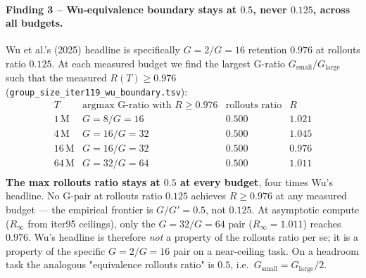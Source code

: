 \paragraph{Finding 3 -- Wu-equivalence boundary stays at $0.5$, never
$0.125$, across all budgets.}
Wu et al.'s (2025) headline is specifically $G{=}2/G{=}16$ retention
$0.976$ at rollouts ratio $0.125$.  At each measured budget we find
the largest G-ratio $G_{\mathrm{small}}/G_{\mathrm{large}}$ such that
the measured $R(T){\ge}0.976$
(\texttt{group\_size\_iter119\_wu\_boundary.tsv}):
\[
\begin{array}{lccc}
T & \text{argmax G-ratio with }R{\ge}0.976 & \text{rollouts ratio} & R \\
\hline
1\,\mathrm{M}  & G{=}8/G{=}16   & 0.500 & 1.021 \\
4\,\mathrm{M}  & G{=}16/G{=}32  & 0.500 & 1.045 \\
16\,\mathrm{M} & G{=}16/G{=}32  & 0.500 & 0.976 \\
64\,\mathrm{M} & G{=}32/G{=}64  & 0.500 & 1.011 \\
\end{array}
\]
\textbf{The max rollouts ratio stays at $0.5$ at every budget}, four
times Wu's headline.  No G-pair at rollouts ratio $0.125$ achieves
$R{\ge}0.976$ at any measured budget --- the empirical frontier is
$G/G'{=}0.5$, not $0.125$.  At asymptotic compute ($R_\infty$ from
iter95 ceilings), only the $G{=}32/G{=}64$ pair
($R_\infty{=}1.011$) reaches $0.976$.  Wu's headline is therefore
\emph{not} a property of the rollouts ratio per se; it is a property
of the specific $G{=}2/G{=}16$ pair on a near-ceiling task.  On a
headroom task the analogous "equivalence rollouts ratio" is $0.5$,
i.e.\ $G_{\mathrm{small}}{=}G_{\mathrm{large}}/2$.

